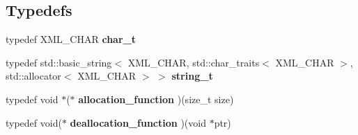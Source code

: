 \subsection*{Typedefs}
\begin{DoxyCompactItemize}
\item 
\hypertarget{namespacephys_1_1xml_a1c4e03e90e7c8e526508111dd1935d33}{
typedef XML\_\-CHAR {\bfseries char\_\-t}}
\label{d9/d27/namespacephys_1_1xml_a1c4e03e90e7c8e526508111dd1935d33}

\item 
\hypertarget{namespacephys_1_1xml_ad721463bf480c1c4e80d423b28eff231}{
typedef std::basic\_\-string$<$ XML\_\-CHAR, std::char\_\-traits$<$ XML\_\-CHAR $>$, std::allocator$<$ XML\_\-CHAR $>$ $>$ {\bfseries string\_\-t}}
\label{d9/d27/namespacephys_1_1xml_ad721463bf480c1c4e80d423b28eff231}

\item 
\hypertarget{namespacephys_1_1xml_a3012ecdd41040d1471217fdac32c76ca}{
typedef void $\ast$($\ast$ {\bfseries allocation\_\-function} )(size\_\-t size)}
\label{d9/d27/namespacephys_1_1xml_a3012ecdd41040d1471217fdac32c76ca}

\item 
\hypertarget{namespacephys_1_1xml_a042e00af30d526d7d17bc4aaa3e7c592}{
typedef void($\ast$ {\bfseries deallocation\_\-function} )(void $\ast$ptr)}
\label{d9/d27/namespacephys_1_1xml_a042e00af30d526d7d17bc4aaa3e7c592}

\end{DoxyCompactItemize}
